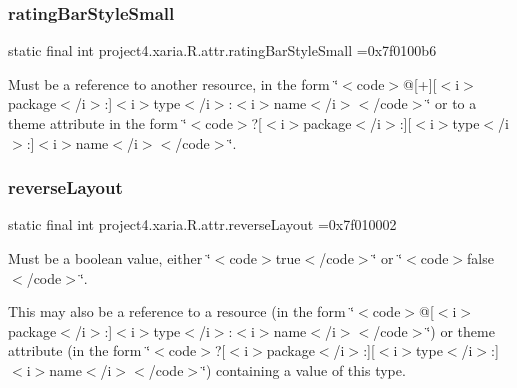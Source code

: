\subsubsection{\texorpdfstring{rating\+Bar\+Style\+Small}{ratingBarStyleSmall}}
{\footnotesize\ttfamily static final int project4.\+xaria.\+R.\+attr.\+rating\+Bar\+Style\+Small =0x7f0100b6\hspace{0.3cm}{\ttfamily [static]}}

Must be a reference to another resource, in the form \char`\"{}$<$code$>$@\mbox{[}+\mbox{]}\mbox{[}$<$i$>$package$<$/i$>$\+:\mbox{]}$<$i$>$type$<$/i$>$\+:$<$i$>$name$<$/i$>$$<$/code$>$\char`\"{} or to a theme attribute in the form \char`\"{}$<$code$>$?\mbox{[}$<$i$>$package$<$/i$>$\+:\mbox{]}\mbox{[}$<$i$>$type$<$/i$>$\+:\mbox{]}$<$i$>$name$<$/i$>$$<$/code$>$\char`\"{}. \mbox{\label{classproject4_1_1xaria_1_1R_1_1attr_ad4cb544d3ca8e42c05df28ea8a04768a}} 
\subsubsection{\texorpdfstring{reverse\+Layout}{reverseLayout}}
{\footnotesize\ttfamily static final int project4.\+xaria.\+R.\+attr.\+reverse\+Layout =0x7f010002\hspace{0.3cm}{\ttfamily [static]}}

Must be a boolean value, either \char`\"{}$<$code$>$true$<$/code$>$\char`\"{} or \char`\"{}$<$code$>$false$<$/code$>$\char`\"{}. 

This may also be a reference to a resource (in the form \char`\"{}$<$code$>$@\mbox{[}$<$i$>$package$<$/i$>$\+:\mbox{]}$<$i$>$type$<$/i$>$\+:$<$i$>$name$<$/i$>$$<$/code$>$\char`\"{}) or theme attribute (in the form \char`\"{}$<$code$>$?\mbox{[}$<$i$>$package$<$/i$>$\+:\mbox{]}\mbox{[}$<$i$>$type$<$/i$>$\+:\mbox{]}$<$i$>$name$<$/i$>$$<$/code$>$\char`\"{}) containing a value of this type. \mbox{\label{classproject4_1_1xaria_1_1R_1_1attr_a712044b29c07e7adbd925eb4812660fe}} 
